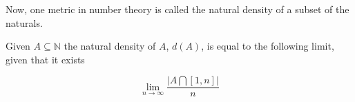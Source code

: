 \documentclass[paper=a4,fontsize=paper,12.5pt]{book}
\newcommand{\3}{\vspace*{3mm}}
\newcommand{\N}{\mathbb{N}}
\begin{document}
Now, one metric in number theory is called the natural density of a subset of the naturals.

\begin{definition}

Given $A \subseteq \N$ the natural density of $A$, $d(A)$, is equal to the following limit, given that it exists 

\[ \lim_{n \to \infty} \frac{\vert A \bigcap [1,n] \vert}{n} \]

\end{definition}
\end{document}
